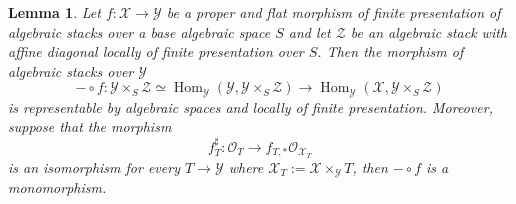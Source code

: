 \documentclass{amsart}
\newcommand{\cO}{\mathcal{O}}
\newcommand{\cX}{\mathcal{X}}
\newcommand{\cY}{\mathcal{Y}}
\newcommand{\cZ}{\mathcal{Z}}
\newcommand{\Hom}{\operatorname{Hom}}
\newtheorem{Lemma}[theorem]{Lemma}
\theoremstyle{definition}
\begin{document}
\begin{Lemma}\label{lem:very-weak-rig}
Let $f:\cX \rightarrow \cY$ be a 
 proper and flat morphism of finite presentation of algebraic stacks over a base algebraic space $S$ and let $\cZ$ be an algebraic stack with affine diagonal locally of finite presentation over $S$. Then the morphism of algebraic stacks over $\cY$
$$- \circ f: \cY\times_S\cZ\simeq\Hom_{\cY}(\cY,\cY\times_S\cZ) \longrightarrow \Hom_{\cY}(\cX,\cY\times_S\cZ)$$
is representable by algebraic spaces and locally of finite presentation.
Moreover, suppose that the morphism $$f^{\sharp}_T:\cO_{T}\rightarrow f_{T,*}\cO_{\cX_T}$$
is an isomorphism for every $T\rightarrow \cY$ where $\cX_T:=\cX \times_{\cY} T$, then $- \circ f$ is a monomorphism. 


\end{Lemma}
\end{document}

